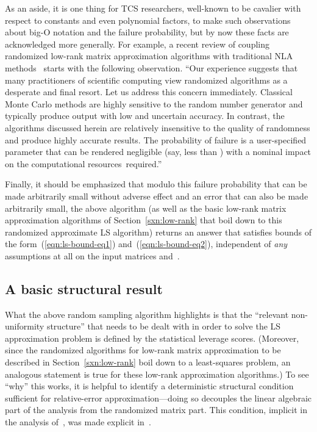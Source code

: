 \documentclass[twoside]{article}
\begin{document}
As an aside, it is one thing for TCS researchers, well-known to be cavalier 
with respect to constants and even polynomial factors, to make such 
observations about big-O notation and the failure probability, but by now 
these facts are acknowledged more generally.
For example, a recent review of coupling randomized low-rank matrix 
approximation algorithms with traditional NLA methods~\cite{HMT09_SIREV} starts 
with the following observation.
``Our experience suggests that many practitioners of scientific computing
view randomized algorithms as a desperate and final resort. Let us address
this concern immediately.  Classical Monte Carlo methods are highly 
sensitive to the random number generator and typically produce output with 
low and uncertain accuracy.  In contrast, the algorithms discussed herein 
are relatively insensitive to the quality of randomness and produce highly 
accurate results. The probability of failure is a user-specified parameter 
that can be rendered negligible (say, less than ) with a nominal 
impact on the computational resources~required.''

Finally, it should be emphasized that modulo this failure probability 
 that can be made arbitrarily small without adverse effect and an 
error  that can also be made arbitrarily small, the above 
algorithm (as well as the basic low-rank matrix approximation algorithms 
of Section~\ref{sxn:low-rank} that boil down to this randomized approximate 
LS algorithm) returns an answer  that satisfies bounds of 
the form~(\ref{eqn:ls-bound-eq1}) and~(\ref{eqn:ls-bound-eq2}), independent 
of \emph{any} assumptions at all on the input matrices  and~.


\subsection{A basic structural result}
\label{sxn:least-squares:structural}

What the above random sampling algorithm highlights is that the 
``relevant non-uniformity structure'' that needs to be dealt with in order 
to solve the LS approximation problem is defined by the statistical leverage 
scores.
(Moreover, since the randomized algorithms for low-rank matrix 
approximation to be described in Section~\ref{sxn:low-rank} boil down to a 
least-squares problem, an analogous statement is true for these low-rank 
approximation algorithms.)
To see ``why'' this works, it is helpful to identify a deterministic 
structural condition sufficient for relative-error approximation---doing so
decouples the linear algebraic part of the analysis from the randomized 
matrix part.
This condition, implicit in the analysis 
of~\cite{DMM06,DMM08_CURtheory_JRNL}, was made explicit 
in~\cite{DMMS07_FastL2_NM10}.
\end{document}
